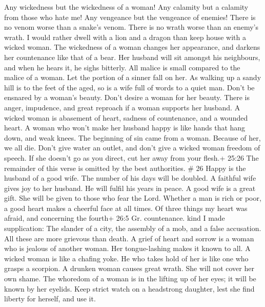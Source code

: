 Any wickedness but the wickedness of a woman!  Any calamity
but a calamity from those who hate me! Any vengeance but the vengeance
of enemies!  There is no venom worse than a snake's venom.
There is no wrath worse than an enemy's wrath.  I would
rather dwell with a lion and a dragon than keep house with a wicked
woman.  The wickedness of a woman changes her appearance,
and darkens her countenance like that of a bear.  Her
husband will sit amongst his neighbours, and when he hears it, he sighs
bitterly.  All malice is small compared to the malice of a
woman. Let the portion of a sinner fall on her.  As walking
up a sandy hill is to the feet of the aged, so is a wife full of words
to a quiet man.  Don't be ensnared by a woman's beauty.
Don't desire a woman for her beauty.  There is anger,
impudence, and great reproach if a woman supports her husband.
 A wicked woman is abasement of heart, sadness of
countenance, and a wounded heart. A woman who won't make her husband
happy is like hands that hang down, and weak knees.  The
beginning of sin came from a woman. Because of her, we all die.
 Don't give water an outlet, and don't give a wicked woman
freedom of speech.  If she doesn't go as you direct, cut
her away from your flesh.+ 25:26 The remainder of this verse is omitted
by the best authorities. \# 26  Happy is the husband of a
good wife. The number of his days will be doubled.  A
faithful wife gives joy to her husband. He will fulfil his years in
peace.  A good wife is a great gift. She will be given to
those who fear the Lord.  Whether a man is rich or poor, a
good heart makes a cheerful face at all times.  Of three
things my heart was afraid, and concerning the fourth+ 26:5 Gr.
countenance. kind I made supplication: The slander of a city, the
assembly of a mob, and a false accusation. All these are more grievous
than death.  A grief of heart and sorrow is a woman who is
jealous of another woman. Her tongue-lashing makes it known to all.
 A wicked woman is like a chafing yoke. He who takes hold of
her is like one who grasps a scorpion.  A drunken woman
causes great wrath. She will not cover her own shame.  The
whoredom of a woman is in the lifting up of her eyes; it will be known
by her eyelids.  Keep strict watch on a headstrong
daughter, lest she find liberty for herself, and use it. 
